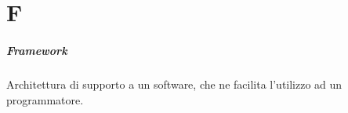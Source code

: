 \chapter{F}

\paragraph*{Framework}
Architettura di supporto a un software, che ne facilita l'utilizzo ad un programmatore. 